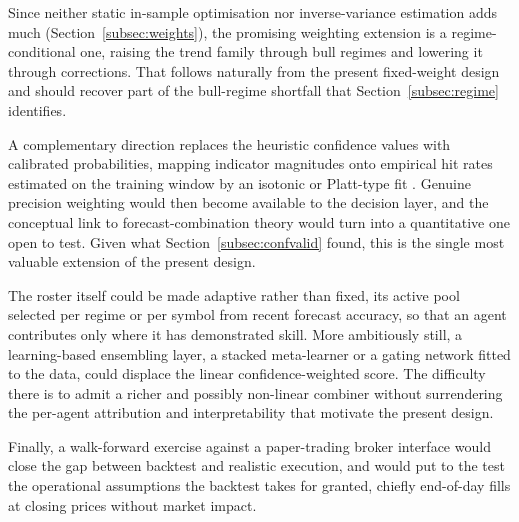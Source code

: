 Since neither static in-sample optimisation nor inverse-variance estimation adds much (Section~\ref{subsec:weights}), the promising weighting extension is a regime-conditional one, raising the trend family through bull regimes and lowering it through corrections. That follows naturally from the present fixed-weight design and should recover part of the bull-regime shortfall that Section~\ref{subsec:regime} identifies.

A complementary direction replaces the heuristic confidence values with calibrated probabilities, mapping indicator magnitudes onto empirical hit rates estimated on the training window by an isotonic or Platt-type fit \cite{murphywinkler1987}. Genuine precision weighting would then become available to the decision layer, and the conceptual link to forecast-combination theory would turn into a quantitative one open to test. Given what Section~\ref{subsec:confvalid} found, this is the single most valuable extension of the present design.

The roster itself could be made adaptive rather than fixed, its active pool selected per regime or per symbol from recent forecast accuracy, so that an agent contributes only where it has demonstrated skill. More ambitiously still, a learning-based ensembling layer, a stacked meta-learner or a gating network fitted to the data, could displace the linear confidence-weighted score. The difficulty there is to admit a richer and possibly non-linear combiner without surrendering the per-agent attribution and interpretability that motivate the present design.

Finally, a walk-forward exercise against a paper-trading broker interface would close the gap between backtest and realistic execution, and would put to the test the operational assumptions the backtest takes for granted, chiefly end-of-day fills at closing prices without market impact.
